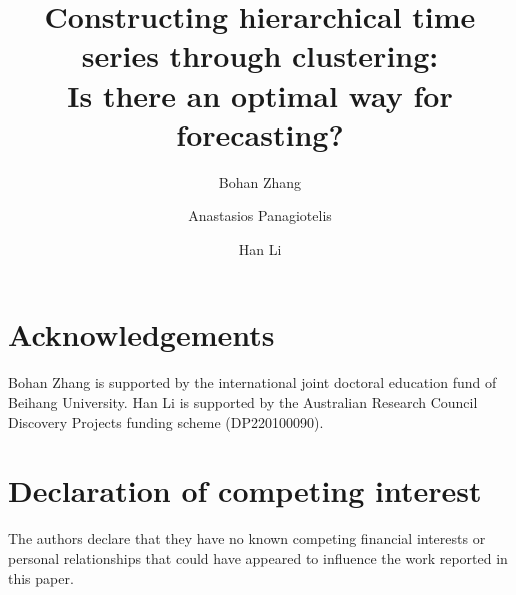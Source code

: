\documentclass[a4paper,review,12pt,authoryear]{elsarticle}
\begin{document}
\begin{frontmatter}

\title{Constructing hierarchical time series through clustering: \\Is there an optimal way for forecasting?}



\author[label1]{Bohan Zhang}
\address[label1]{School of Economics and Management, Beihang University, Beijing, China}
\author[label2]{Anastasios Panagiotelis}
\address[label2]{The University of Sydney Business School, NSW 2006, Australia}
\author[label3]{Han Li}
\address[label3]{Department of Economics, The University of Melbourne, VIC 3010, Australia}


\end{frontmatter}

\section*{Acknowledgements}

Bohan Zhang is supported by the international joint doctoral education fund of Beihang University. Han Li is supported by the Australian Research Council Discovery Projects funding scheme (DP220100090).

\section*{Declaration of competing interest}

The authors declare that they have no known competing financial interests or personal relationships that could have appeared to influence the work reported in this paper. 
\end{document}
